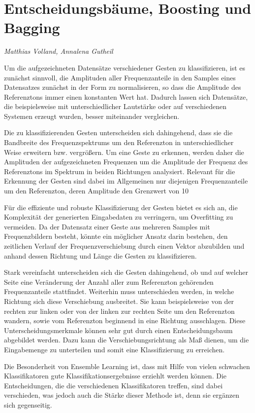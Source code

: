 \section{Entscheidungsbäume, Boosting und Bagging}
\textit{Matthias Volland, Annalena Gutheil}


Um die aufgezeichneten Datensätze verschiedener Gesten zu klassifizieren, ist es zunächst sinnvoll, die Amplituden aller Frequenzanteile in den Samples eines Datensatzes zunächst in der Form zu normalisieren, so dass die Amplitude des Referenztons immer einen konstanten Wert hat. Dadurch lassen sich Datensätze, die beispielsweise mit unterschiedlicher Lautstärke oder auf verschiedenen Systemen erzeugt wurden, besser miteinander vergleichen.

Die zu klassifizierenden Gesten unterscheiden sich dahingehend, dass sie die Bandbreite des Frequenzspektrums um den Referenzton in unterschiedlicher Weise erweitern bzw. vergrößern. Um eine Geste zu erkennen, werden daher die Amplituden der aufgezeichneten Frequenzen um die Amplitude der Frequenz des Referenztons im Spektrum in beiden Richtungen analysiert. Relevant für die Erkennung der Gesten sind dabei im Allgemeinen nur diejenigen Frequenzanteile um den Referenzton, deren Amplitude den Grenzwert von 10%

Für die effiziente und robuste Klassifizierung der Gesten bietet es sich an, die Komplexität der generierten Eingabedaten zu verringern, um Overfitting zu vermeiden. Da der Datensatz einer Geste aus mehreren Samples mit Frequenzbildern besteht, könnte ein möglicher Ansatz darin bestehen, den zeitlichen Verlauf der Frequenzverschiebung durch einen Vektor abzubilden und anhand dessen Richtung und Länge die Gesten zu klassifizieren.

Stark vereinfacht unterscheiden sich die Gesten dahingehend, ob und auf welcher Seite eine Veränderung der Anzahl aller zum Referenzton gehörenden Frequenzanteile stattfindet. Weiterhin muss unterschieden werden, in welche Richtung sich diese Verschiebung ausbreitet. Sie kann beispielsweise von der rechten zur linken oder von der linken zur rechten Seite um den Referenzton wandern, sowie vom Referenzton beginnend in eine Richtung ausschlagen. Diese Unterscheidungsmerkmale können sehr gut durch einen Entscheidungsbaum abgebildet werden. Dazu kann die Verschiebungsrichtung als Maß dienen, um die Eingabemenge zu unterteilen und somit eine Klassifizierung zu erreichen.

Die Besonderheit von Ensemble Learning ist, dass mit Hilfe von vielen schwachen Klassifikatoren gute Klassifikationsergebnisse erziehlt werden können. Die Entscheidungen, die die verschiedenen Klassifikatoren treffen, sind dabei verschieden, was jedoch auch die Stärke dieser Methode ist, denn sie ergänzen sich gegenseitig.
